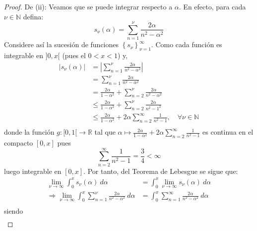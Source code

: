 \documentclass[12pt]{report}
\theoremstyle{largebreak}
\renewcommand{\leq}{\ensuremath{\leqslant}}
\newcommand\abs[1]{\ensuremath{\left|#1\right|}}
\newcommand\cf[3]{\ensuremath{#1:#2\rightarrow#3}}
\begin{document}
\begin{proof}
        De (ii): Veamos que se puede integrar respecto a $\alpha$. En efecto, para cada $\nu\in\mathbb{N}$ defina:
        \begin{equation*}
            s_\nu(\alpha)=\sum_{n=1}^\nu\frac{2\alpha}{n^2-\alpha^2}
        \end{equation*}
        Considere así la sucesión de funciones $\left\{s_\nu\right\}_{\nu=1}^\infty$. Como cada función es integrable en $]0,x[$ (pues el $0<x<1$) y,
        \begin{equation*}
            \begin{split}
                \abs{s_\nu(\alpha)}&=\abs{\sum_{n=1}^\nu\frac{2\alpha}{n^2-\alpha^2}}\\
                &=\sum_{n=1}^\nu\frac{2\alpha}{n^2-\alpha^2}\\
                &=\frac{2\alpha}{1-\alpha^2}+\sum_{n=2}^\nu\frac{2\alpha}{n^2-\alpha^2}\\
                &\leq\frac{2\alpha}{1-\alpha^2}+\sum_{n=2}^\nu\frac{2\alpha}{n^2-1^2}\\
                &\leq\frac{2\alpha}{1-\alpha^2}+2\alpha\sum_{n=2}^\infty\frac{1}{n^2-1},\quad\forall\nu\in\mathbb{N} \\
            \end{split}
        \end{equation*}
        donde la función $\cf{g}{[0,1[}{\mathbb{R}}$ tal que $\alpha\mapsto \frac{2\alpha}{1-\alpha^2}+2\alpha\sum_{n=2}^\infty\frac{1}{n^2-1}$ es continua en el compacto $[0,x]$ pues
        \begin{equation*}
            \sum_{n=2}^\infty\frac{1}{n^2-1}=\frac{3}{4}<\infty
        \end{equation*}
        luego integrable en $[0,x]$. Por tanto, del Teorema de Lebesgue se sigue que:
        \begin{equation*}
            \begin{split}
                \lim_{\nu\rightarrow\infty}\int_{0}^x s_\nu(\alpha)\:d\alpha&=\int_0^x\lim_{\nu\rightarrow\infty}s_\nu(\alpha)\:d\alpha\\
                \Rightarrow \lim_{\nu\rightarrow\infty}\int_{0}^x \sum_{n=1}^\nu\frac{2\alpha}{n^2-\alpha^2}\:d\alpha&=\int_0^x\sum_{ n=1}^\infty\frac{2\alpha}{n^2-\alpha^2}\:d\alpha\\
            \end{split}
        \end{equation*}
        siendo
        \begin{equation*}
            \begin{split}

\end{split}
\end{equation*}
\end{proof}
\end{document}
